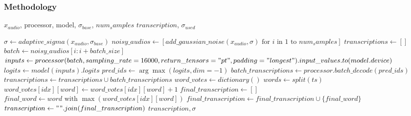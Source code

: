 \documentclass[a4paper,12pt]{article}
\begin{document}
\newpage
\subsubsection{Methodology}
\begin{algorithm}
\caption{Randomized Smoothing Defense}
\begin{algorithmic}[1]
\Require $x_{audio}$, processor, model, $\sigma_{base}$, $num_samples$ 
\Ensure $transcription$, $\sigma_{used}$ 

\State $\sigma \gets adaptive\_sigma(x_{audio}, \sigma_{base})$ 
\State $noisy\_audios \gets [add\_gaussian\_noise(x_{audio}, \sigma) \text{ for } i \text{ in } 1 \text{ to } num_samples]$ 
\State $transcriptions \gets []$ 
 
    \State $batch \gets noisy\_audios[i:i+batch\_size]$
    \State $inputs \gets processor(batch, sampling\_rate=16000, return\_tensors="pt", padding="longest").input\_values.to(model.device)$ 
    \State $logits \gets model(inputs).logits$ 
    \State $pred\_ids \gets \arg\max(logits, dim=-1)$ 
    \State $batch\_transcriptions \gets processor.batch\_decode(pred\_ids)$ 
    \State $transcriptions \gets transcriptions \cup batch\_transcriptions$ 
\EndFor
\State $word\_votes \gets dictionary()$ 
 
    \State $words \gets split(ts)$
        \State $word\_votes[idx][word] \gets word\_votes[idx][word] + 1$
    \EndFor
\EndFor
\State $final\_transcription \gets []$ 
 
        \State $final\_word \gets word \text{ with } \max(word\_votes[idx][word])$
        \State $final\_transcription \gets final\_transcription \cup \{final\_word\}$
    \EndIf
\EndFor
\State $transcription \gets " ".join(final\_transcription)$ 
\State \Return $transcription, \sigma$ 
\end{algorithmic}
\end{algorithm}
\end{document}

